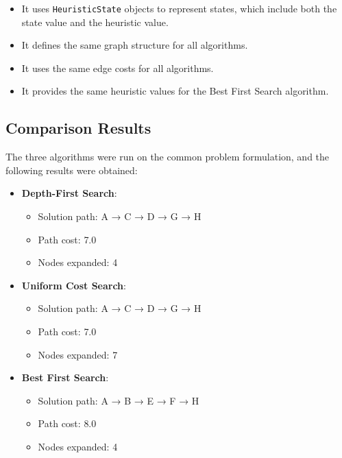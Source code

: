 \documentclass[12pt,a4paper]{article}
\begin{document}
\begin{itemize}
    \item It uses \texttt{HeuristicState} objects to represent states, which include both the state value and the heuristic value.
    \item It defines the same graph structure for all algorithms.
    \item It uses the same edge costs for all algorithms.
    \item It provides the same heuristic values for the Best First Search algorithm.
\end{itemize}

\subsection{Comparison Results}

The three algorithms were run on the common problem formulation, and the following results were obtained:

\begin{itemize}
    \item \textcolor{sectioncolor}{\textbf{Depth-First Search}}:
    \begin{itemize}
        \item Solution path: \textcolor{sectioncolor}{A → C → D → G → H}
        \item Path cost: \textcolor{sectioncolor}{7.0}
        \item Nodes expanded: \textcolor{sectioncolor}{4}
    \end{itemize}
    \item \textcolor{subsectioncolor}{\textbf{Uniform Cost Search}}:
    \begin{itemize}
        \item Solution path: \textcolor{subsectioncolor}{A → C → D → G → H}
        \item Path cost: \textcolor{subsectioncolor}{7.0}
        \item Nodes expanded: \textcolor{subsectioncolor}{7}
    \end{itemize}
    \item \textcolor{subsubsectioncolor}{\textbf{Best First Search}}:
    \begin{itemize}
        \item Solution path: \textcolor{subsubsectioncolor}{A → B → E → F → H}
        \item Path cost: \textcolor{subsubsectioncolor}{8.0}
        \item Nodes expanded: \textcolor{subsubsectioncolor}{4}
    \end{itemize}
\end{itemize}
\end{document}
